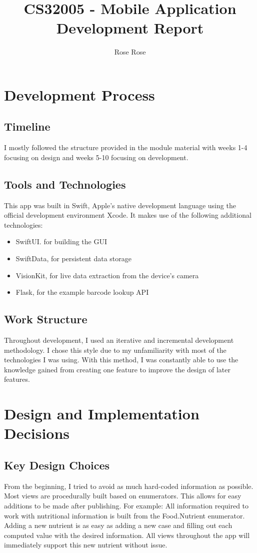 \documentclass[11pt, oneside]{article}   	%
\title{CS32005 - Mobile Application Development Report}
\author{Rose Rose}
\date{}
\begin{document}
\maketitle
\section{Development Process}
\subsection{Timeline}
I mostly followed the structure provided in the module material with weeks 1-4 focusing on design and weeks 5-10 focusing on development.
\subsection{Tools and Technologies}
This app was built in Swift, Apple's native development language using the official development environment Xcode. It makes use of the following additional technologies:
\begin{itemize}
	\item SwiftUI. for building the GUI
	\item SwiftData, for persistent data storage
	\item VisionKit, for live data extraction from the device's camera
	\item Flask, for the example barcode lookup API
\end{itemize}
\subsection{Work Structure}
Throughout development, I used an iterative and incremental development methodology. I chose this style due to my unfamiliarity with most of the technologies I was using. With this method, I was constantly able to use the knowledge gained from creating one feature to improve the design of later features.
\section{Design and Implementation Decisions}
\subsection{Key Design Choices}
From the beginning, I tried to avoid as much hard-coded information as possible. Most views are procedurally built based on enumerators. This allows for easy additions to be made after publishing. For example: All information required to work with nutritional information is built from the Food.Nutrient enumerator. Adding a new nutrient is as easy as adding a new case and filling out each computed value with the desired information. All views throughout the app will immediately support this new nutrient without issue.
\end{document}
